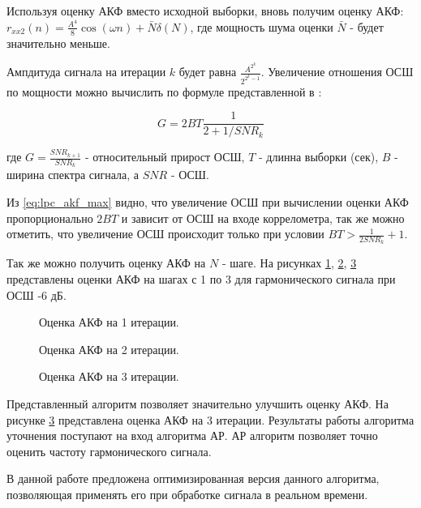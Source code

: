 Используя оценку АКФ вместо исходной выборки, вновь получим оценку АКФ:
${r_{xx2}(n) = \frac{A^4}{8} \cos{(\omega n)} + \bar{N} \delta{(N)}}$,
где мощность шума оценки ${\bar{N}}$ - будет значительно меньше.

Ампдитуда сигнала на итерации ${k}$ будет равна ${\frac{A^{2^k}}{2^{2^k-1}}}$. Увеличение отношения ОСШ по мощности можно
вычислить по формуле представленной в \cite{book_max}:
\begin{center}
\begin{equation}
	\label{eq:lpc_akf_max}
	G=2BT \frac{1}{2+1/SNR_k}
\end{equation}
\end{center}
где ${G=\frac{SNR_{k+1}}{SNR_k}}$ - относительный прирост ОСШ, ${T}$ - длинна выборки (сек), ${B}$ -  ширина спектра сигнала, 
а ${SNR}$ - ОСШ.

Из \ref{eq:lpc_akf_max} видно, что увеличение ОСШ при вычислении оценки АКФ пропорционально ${2BT}$ и зависит от
ОСШ на входе коррелометра, так же можно отметить, что увеличение ОСШ происходит только при условии ${BT > \frac{1}{2SNR_k} + 1}$.

Так же можно получить оценку АКФ на ${N}$ - шаге. На рисунках \ref{pic:acf_1_iter},
\ref{pic:acf_2_iter}, \ref{pic:acf_3_iter} представлены оценки АКФ на шагах с 1 по 3 для гармонического сигнала при ОСШ -6 дБ.

\begin{figure}[H]
	\center{}
	\caption{Оценка АКФ на 1 итерации.}
	\label{pic:acf_1_iter}
\end{figure}

\begin{figure}[H]
	\center{}
	\caption{Оценка АКФ на 2 итерации.}
	\label{pic:acf_2_iter}
\end{figure}

\begin{figure}[H]
	\center{}
	\caption{Оценка АКФ на 3 итерации.}
	\label{pic:acf_3_iter}
\end{figure}

Представленный алгоритм позволяет значительно улучшить оценку АКФ. На рисунке \ref{pic:acf_3_iter} представлена оценка АКФ на 3 итерации.
Результаты работы алгоритма уточнения поступают на вход алгоритма АР. АР алгоритм позволяет точно оценить частоту гармонического сигнала.

В данной работе предложена оптимизированная версия данного алгоритма, позволяющая применять его при обработке сигнала в реальном времени.

